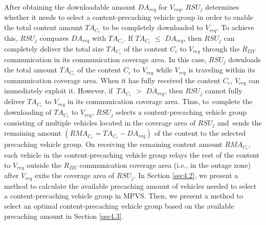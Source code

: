 \documentclass[sensors,aricle,accept,pdftex,moreauthors]{Definitions/mdpi}
\begin{document}
After obtaining the downloadable amount $DA_{req}$ for $V_{req}$, $RSU_{j}$ determines whether it needs to select a content-precaching vehicle group in order to enable the total content amount $TA_{C_{c}}$ to be completely downloaded to $V_{req}$.
To achieve this, $RSU_{j}$ compares $DA_{req}$ with $TA_{C_{c}}$. 
If $TA_{C_{c}}$ $\leq$ $DA_{req}$, then $RSU_{j}$ can completely deliver the total size $TA_{C_{c}}$ of the content $C_{c}$ to $V_{req}$ through the $R_{I2V}$ communication in its communication coverage area. 
In this case, $RSU_{j}$ downloads the total amount $TA_{C_{c}}$ of the content $C_{c}$ to $V_{req}$ while $V_{req}$ is traveling within its communication coverage area. 
When it has fully received the content $C_{c}$, $V_{req}$ can immediately exploit it.
However, if~$TA_{C_{c}}$ $>$ $DA_{req}$, then $RSU_{j}$ cannot fully deliver $TA_{C_{c}}$ to $V_{req}$ in its communication coverage area. 
Thus, to~complete the downloading of $TA_{C_{c}}$ to $V_{req}$, $RSU_{j}$ selects a content-precaching vehicle group consisting of multiple vehicles located in the coverage area of $RSU_{j}$ and~sends the remaining amount $(RMA_{C_{c}}=TA_{C_{c}}-DA_{req})$ of the content to the selected precaching vehicle group.
On receiving the remaining content amount $RMA_{C_{c}}$, each vehicle in the content-precaching vehicle group relays the rest of the content to $V_{req}$ outside the $R_{I2V}$ communication coverage area (i.e., in the outage zone) after $V_{req}$ exits the coverage area of $RSU_{j}$.
In Section \ref{sec4.2}, we present a method to calculate the available precaching amount of vehicles needed to select a content-precaching vehicle group in MPVS. 
Then, we present a method to select an optimal content-precaching vehicle group based on the available precaching amount in Section \ref{sec4.3}.
\end{document}
